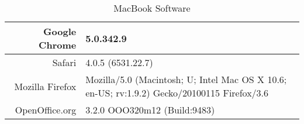 \begin{table}
    \begin{center}
    \begin{tabular}{| r | p{5cm} |}
      \hline
      Google Chrome       & 5.0.342.9 \\ \hline
      Safari              & 4.0.5 (6531.22.7) \\ \hline
      Mozilla Firefox     & Mozilla/5.0 (Macintosh; U; Intel Mac OS X 10.6; en-US;
                            rv:1.9.2) Gecko/20100115 Firefox/3.6 \\ \hline
      OpenOffice.org      & 3.2.0 OOO320m12 (Build:9483) \\
      \hline
    \end{tabular}
    \caption{MacBook Software}
    \label{macbookSoftware}
    \end{center}
  \end{table}
